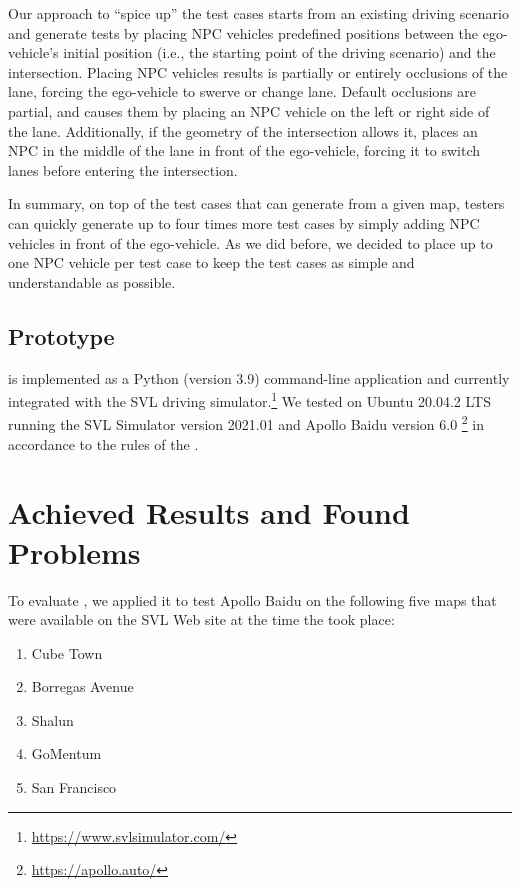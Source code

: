 \documentclass[conference]{IEEEtran}
\begin{document}
Our approach to ``spice up'' the test cases starts from an existing driving scenario and generate tests by placing NPC vehicles predefined positions between the ego-vehicle's initial position (i.e., the starting point of the driving scenario) and the intersection. Placing NPC vehicles results is partially or entirely occlusions of the lane, forcing the ego-vehicle to swerve or change lane. Default occlusions are partial, and \tool causes them by placing an NPC vehicle on the left or right side of the lane. Additionally, if the geometry of the intersection allows it, \tool places an NPC in the middle of the lane in front of the ego-vehicle, forcing it to switch lanes before entering the intersection.

In summary, on top of the test cases that \tool can generate from a given map, testers can quickly generate up to four times more test cases by simply adding NPC vehicles in front of the ego-vehicle. As we did before, we decided to place up to one NPC vehicle per test case to keep the test cases as simple and understandable as possible.

\subsection{Prototype}
\tool is implemented as a Python (version 3.9) command-line application and currently integrated with the SVL driving simulator.\footnote{\href{https://www.svlsimulator.com/}{https://www.svlsimulator.com/}} 
%
We tested \tool on Ubuntu 20.04.2 LTS running the SVL Simulator version 2021.01 and Apollo Baidu version 6.0 \footnote{\href{https://apollo.auto/}{https://apollo.auto/}} in accordance to the rules of the \challenge.

\section{Achieved Results and Found Problems}
To evaluate \tool, we applied it to test Apollo Baidu on the following five maps that were available on the SVL Web site at the time the \challenge took place:

\begin{enumerate}
 \item Cube Town
 \item Borregas Avenue
 \item Shalun
 \item GoMentum
 \item San Francisco
\end{enumerate}
\end{document}
